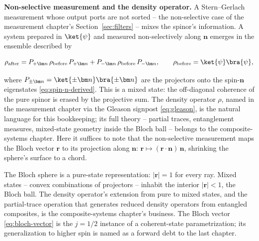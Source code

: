 \medskip\noindent\textbf{Non-selective measurement and the density operator.}
A Stern--Gerlach measurement whose output ports are not sorted -- the non-selective case of the measurement chapter's Section~\ref{sec:filters} -- mixes the spinor's information. A system prepared in $\ket{\psi}$ and measured non-selectively along $\bm n$ emerges in the ensemble described by
\begin{linenomath}
  \begin{equation}
    \rho_{\text{after}}
    = P_{+\bm n}\,\rho_{\text{before}}\,P_{+\bm n}
    + P_{-\bm n}\,\rho_{\text{before}}\,P_{-\bm n},
    \qquad
    \rho_{\text{before}} = \ket{\psi}\bra{\psi},
  \end{equation}
\end{linenomath}
where $P_{\pm\bm n} = \ket{\pm\bm n}\bra{\pm\bm n}$ are the projectors onto the spin-$\bm n$ eigenstates \eqref{eq:spin-n-derived}. This is a mixed state: the off-diagonal coherence of the pure spinor is erased by the projective sum. The density operator $\rho$, named in the measurement chapter via the Gleason signpost \eqref{eq:gleason}, is the natural language for this bookkeeping; its full theory -- partial traces, entanglement measures, mixed-state geometry inside the Bloch ball -- belongs to the composite-systems chapter. Here it suffices to note that the non-selective measurement maps the Bloch vector $\bm r$ to its projection along $\bm n$: $\bm r \mapsto (\bm r\cdot\bm n)\,\bm n$, shrinking the sphere's surface to a chord.

\begin{note}
  The Bloch sphere is a pure-state representation: $|\bm r| = 1$ for every ray. Mixed states -- convex combinations of projectors -- inhabit the interior $|\bm r| < 1$, the Bloch ball. The density operator's extension from pure to mixed states, and the partial-trace operation that generates reduced density operators from entangled composites, is the composite-systems chapter's business. The Bloch vector \eqref{eq:bloch-vector} is the $j=1/2$ instance of a coherent-state parametrization; its generalization to higher spin is named as a forward debt to the last chapter.
\end{note}

